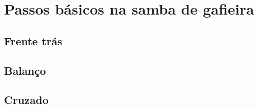 

\chapter{Passos básicos na samba de gafieira}

\section{Frente trás}

\section{Balanço}

\section{Cruzado}

